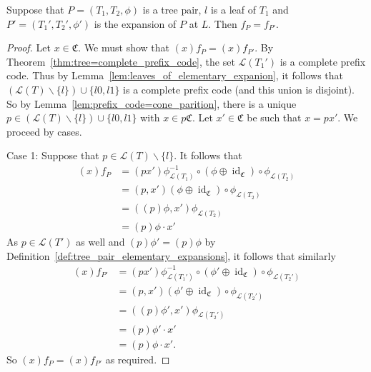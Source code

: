 \begin{lemma}\label{lem:expansions_are_safe}
Suppose that \(P=(T_1,T_2,\phi)\) is a tree pair, \(l\) is a leaf of \(T_1\) and \(P'=(T_1',T_2',\phi')\) is the expansion of \(P\) at \(L\).
Then \(f_{P}=f_{P'}\).
\end{lemma}
\begin{proof}
Let \(x\in \mathfrak{C}\).
We must show that \((x)f_P=(x)f_{P'}\).
By Theorem~\ref{thm:tree=complete_prefix_code}, the set \(\mathcal{L}(T_1')\) is a complete prefix code.
Thus by Lemma~\ref{lem:leaves_of_elementary_expanion}, it follows that \((\mathcal{L}(T)\backslash \{l\})\cup \{l0,l1\}\) is a complete prefix code (and this union is disjoint).
So by Lemma~\ref{lem:prefix_code=cone_parition}, there is a unique \(p\in (\mathcal{L}(T)\backslash \{l\})\cup \{l0,l1\}\) with \(x\in p\mathfrak{C}\). Let \(x'\in \mathfrak{C}\) be such that \(x=px'\).
We proceed by cases.

Case 1: Suppose that \(p\in \mathcal{L}(T)\backslash \{l\}\). It follows that
\begin{align*}
    (x)f_P&=(px')\phi_{\mathcal{L}(T_1)}^{-1} \circ (\phi \oplus \operatorname{id}_{\mathfrak{C}})\circ \phi_{\mathcal{L}(T_2)}\\
    &= (p,x')(\phi \oplus \operatorname{id}_{\mathfrak{C}})\circ \phi_{\mathcal{L}(T_2)}\\
    &= ((p)\phi,x') \phi_{\mathcal{L}(T_2)}\\
    &= (p)\phi \cdot x' 
\end{align*}
As \(p\in \mathcal{L}(T')\) as well and \((p)\phi'=(p)\phi\) by Definition~\ref{def:tree_pair_elementary_expansions}, it follows that similarly
\begin{align*}
    (x)f_{P'}&=(px')\phi_{\mathcal{L}(T_1')}^{-1} \circ (\phi' \oplus \operatorname{id}_{\mathfrak{C}})\circ \phi_{\mathcal{L}(T_2')}\\
    &= (p,x')(\phi' \oplus \operatorname{id}_{\mathfrak{C}})\circ \phi_{\mathcal{L}(T_2')}\\
    &= ((p)\phi',x') \phi_{\mathcal{L}(T_2')}\\
    &= (p)\phi' \cdot x'\\
    &= (p)\phi \cdot x'.
\end{align*}
So \((x)f_P=(x)f_{P'}\) as required.



\end{proof}
